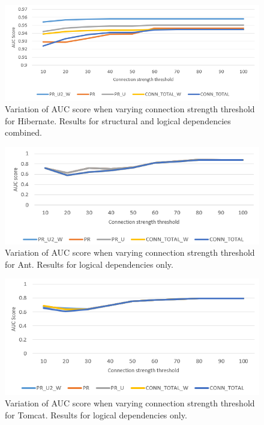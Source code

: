 \documentclass[12pt, a4paper, twoside]{report}
\begin{document}
\begin{figure}[H]
\centering
\includegraphics[width=\textwidth]{hibernate_SD_LD.PNG}
\caption{Variation of AUC score when varying connection strength threshold for Hibernate. Results for structural and logical dependencies combined. }
\label{fig:plot_sd_ld_hibernate}
\centering
\end{figure}



\begin{figure}[H]
\centering
\includegraphics[width=\textwidth]{ant_LD.PNG}
\caption{Variation of AUC score when varying connection strength threshold for Ant. Results for logical dependencies only. }
\label{fig:plot_ld_ant}
\centering
\end{figure}


\begin{figure}[H]
\centering
\includegraphics[width=\textwidth]{tomcat_LD.PNG}
\caption{Variation of AUC score when varying connection strength threshold for Tomcat. Results for logical dependencies only. }
\label{fig:plot_ld_tomcat}
\centering
\end{figure}
\end{document}
